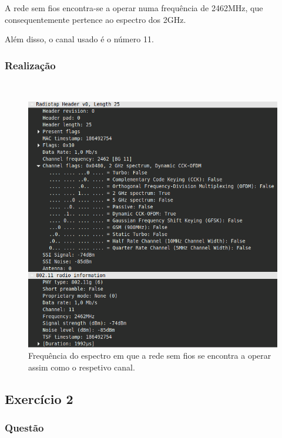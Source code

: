 \documentclass{llncs}
\begin{document}
A rede sem fios encontra-se a operar numa frequência de 2462MHz, que consequentemente pertence ao espectro dos 2GHz. 

Além disso, o canal usado é o número 11.

\subsubsection{Realização}\rule[-10pt]{0pt}{10pt}\\

\begin{figure}
  \begin{center}
  \includegraphics[scale=0.35]{./imagens/ex1.png} 
  \end{center}
  \caption{Frequência do espectro em que a rede sem fios se encontra a operar assim como o respetivo canal.}
  \label{fig:freq}
\end{figure}


\clearpage
\subsection{Exercício 2}
\subsubsection{Questão}\rule[-10pt]{0pt}{10pt}\\
\end{document}
